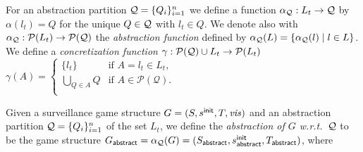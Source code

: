 For an abstraction partition $\mathcal{Q} = \{Q_i\}_{i=1}^n$  we define a function $\alpha_{\mathcal{Q}} : L_t \to \mathcal{Q}$ by $\alpha(l_t) = Q$ for the unique $Q \in \mathcal{Q}$ with $l_t \in Q$. We denote also with $\alpha_{\mathcal{Q}} : \mathcal{P}(L_t) \to \mathcal{P}(\mathcal{Q})$ the \emph{abstraction function} defined by $\alpha_{\mathcal{Q}}(L) = \{\alpha_{\mathcal{Q}}(l) \mid l \in L\}$.
We define a \emph{concretization function} $\gamma :  \mathcal{P}(\mathcal{Q}) \cup L_t \to \mathcal{P}(L_t)$
$
\gamma(A) =
\begin{cases}
\{l_t\} &\text{if } A = l_t \in L_t,\\
\bigcup_{Q \in A} Q &\text{if } A \in \mathcal{P}(\mathcal{Q}).\\
\end{cases}
$

Given a surveillance game structure $G  = (S,s^{\mathsf{init}},T,\mathit{vis})$ and an abstraction partition $\mathcal{Q} = \{Q_i\}_{i=1}^n$ of the set $L_t$, we define the \emph{abstraction of $G$ w.r.t.\ $\mathcal{Q}$} to be the game structure 
$G_{\mathsf{abstract}}  = \alpha_{\mathcal{Q}}(G)= (S_{\mathsf{abstract}},s^{\mathsf{init}}_{\mathsf{abstract}},T_{\mathsf{abstract}})$, where

